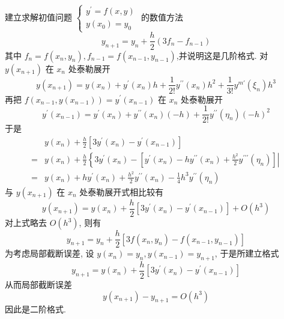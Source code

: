   \begin{tcolorbox}[enhanced,colback=8,colframe=7,breakable,coltitle=green!25!black,title=2024]
 建立求解初值问题
$
\left\{\begin{array}{l}
y^{\prime}=f(x, y) \\
y\left(x_{0}\right)=y_{0}
\end{array}\right.
$
的数值方法
$$
y_{n+1}=y_{n}+\frac{h}{2}\left(3 f_{n}-f_{n-1}\right)
$$
其中 $ f_{n}=f\left(x_{n}, y_{n}\right), f_{n-1}=f\left(x_{n-1}, y_{n-1}\right) $,并说明这是几阶格式.
\tcblower
 对 $ y\left(x_{n+1}\right) $ 在 $ x_{n} $ 处泰勒展开
$$
y\left(x_{n+1}\right)=y\left(x_{n}\right)+y^{\prime}\left(x_{n}\right) h+\frac{1}{2!} y^{\prime \prime}\left(x_{n}\right) h^{2}+\frac{1}{3!} y^{m \prime}\left(\xi_{n}\right) h^{3}
$$
再把 $ f\left(x_{n-1}, y\left(x_{n-1}\right)\right)=y^{\prime}\left(x_{n-1}\right) $ 在 $ x_{n} $ 处泰勒展开
$$
y^{\prime}\left(x_{n-1}\right)=y^{\prime}\left(x_{n}\right)+y^{\prime \prime}\left(x_{n}\right)(-h)+\frac{1}{2!} y^{\prime \prime}\left(\eta_{n}\right)(-h)^{2}
$$
于是
$$
\begin{aligned}
& y\left(x_{n}\right)+\frac{h}{2}\left[3 y^{\prime}\left(x_{n}\right)-y^{\prime}\left(x_{n-1}\right)\right] \\
= & y\left(x_{n}\right)+\frac{h}{2}\left\{\left.3 y^{\prime}\left(x_{n}\right)-\left[y^{\prime}\left(x_{n}\right)-h y^{\prime \prime}\left(x_{n}\right)+\frac{h^{2}}{2} y^{\prime \prime \prime}\left(\eta_{n}\right)\right] \right\rvert\,\right. \\
= & y\left(x_{n}\right)+h y^{\prime}\left(x_{n}\right)+\frac{h^{2}}{2} y^{\prime \prime}\left(x_{n}\right)-\frac{1}{4} h^{3} y^{\prime \prime}\left(\eta_{n}\right)
\end{aligned}
$$
与 $ y\left(x_{n+1}\right) $ 在 $ x_{n} $ 处泰勒展开式相比较有
$$
y\left(x_{n+1}\right)=y\left(x_{n}\right)+\frac{h}{2}\left[3 y^{\prime}\left(x_{n}\right)-y^{\prime}\left(x_{n-1}\right)\right]+O\left(h^{3}\right)
$$
对上式略去 $ O\left(h^{3}\right) $, 则有
$$
y_{n+1}=y_{n}+\frac{h}{2}\left[3 f\left(x_{n}, y_{n}\right)-f\left(x_{n-1}, y_{n-1}\right)\right]
$$
 为考虑局部截断误差, 设 $ y\left(x_{n}\right)=y_{n}, y\left(x_{n-1}\right)=y_{n+1} $, 于是所建立格式
$$
y_{n+1}=y\left(x_{n}\right)+\frac{h}{2}\left[3 y^{\prime}\left(x_{n}\right)-y^{\prime}\left(x_{n-1}\right)\right]
$$
从而局部截断误差
$$
y\left(x_{n+1}\right)-y_{n+1}=O\left(h^{3}\right)
$$
因此是二阶格式.
 \end{tcolorbox}

